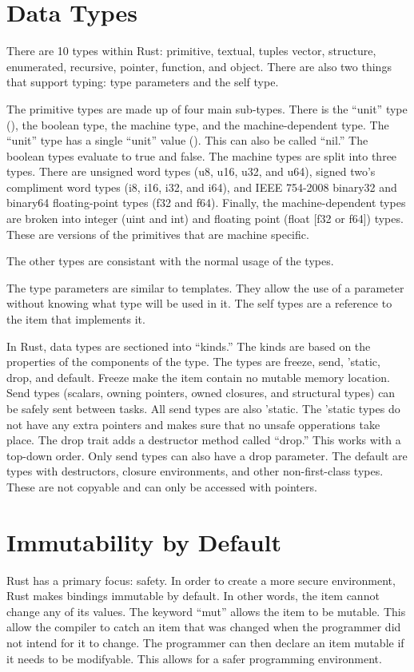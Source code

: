 \documentclass{article}
\begin{document}
\section{Data Types}
There are 10 types within Rust: primitive, textual, tuples vector, structure, enumerated, recursive, pointer, function, and object. There are also two things that support typing: type parameters and the self type.

The primitive types are made up of four main sub-types. There is the “unit” type (), the boolean type, the machine type, and the machine-dependent type. The “unit” type has a single “unit” value (). This can also be called “nil.” The boolean types evaluate to true and false. The machine types are split into three types. There are unsigned word types (u8, u16, u32, and u64), signed two's compliment word types (i8, i16, i32, and i64), and IEEE 754-2008 binary32 and binary64 floating-point types (f32 and f64). Finally, the machine-dependent types are broken into integer (uint and int) and floating point (float [f32 or f64]) types. These are versions of the primitives that are machine specific. 

The other types are consistant with the normal usage of the types.

The type parameters are similar to templates. They allow the use of a parameter without knowing what type will be used in it. The self types are a reference to the item that implements it. 

In Rust, data types are sectioned into “kinds.” The kinds are based on the properties of the components of the type. The types are freeze, send, 'static, drop, and default. Freeze make the item contain no mutable memory location. Send types (scalars, owning pointers, owned closures, and structural types) can be safely sent between tasks. All send types are also 'static. The 'static types do not have any extra pointers and makes sure that no unsafe opperations take place. 
The drop trait adds a destructor method called “drop.” This works with a top-down order. Only send types can also have a drop parameter. The default are types with destructors, closure environments, and other non-first-class types. These are not copyable and can only be accessed with pointers.

\section{Immutability by Default}
Rust has a primary focus: safety. In order to create a more secure environment, Rust makes bindings immutable by default. In other words, the item cannot change any of its values. The keyword “mut” allows the item to be mutable. This allow the compiler to catch an item that was changed when the programmer did not intend for it to change. The programmer can then declare an item mutable if it needs to be modifyable. This allows for a safer programming environment.
\end{document}
